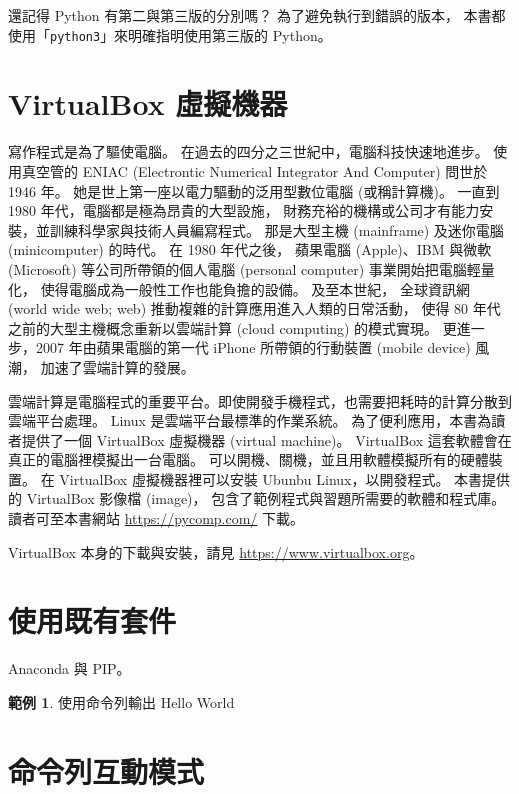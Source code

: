 \documentclass[a4paper,12pt]{book}
\theoremstyle{definition}
\newtheorem{example}{範例}[chapter]
\begin{document}
還記得 Python 有第二與第三版的分別嗎？
為了避免執行到錯誤的版本，
本書都使用「\verb+python3+」來明確指明使用第三版的 Python。

\section{VirtualBox 虛擬機器}
%
\label{c:runtime:vbox}

寫作程式是為了驅使電腦。
在過去的四分之三世紀中，電腦科技快速地進步。
使用真空管的 ENIAC (Electrontic Numerical Integrator And Computer)
問世於 1946 年。
她是世上第一座以電力驅動的泛用型數位電腦 (或稱計算機)。
一直到 1980 年代，電腦都是極為昂貴的大型設施，
財務充裕的機構或公司才有能力安裝，並訓練科學家與技術人員編寫程式。
那是大型主機 (mainframe) 及迷你電腦 (minicomputer) 的時代。
在 1980 年代之後，
蘋果電腦 (Apple)、IBM 與微軟 (Microsoft) 等公司所帶領的個人電腦 (personal computer) 事業開始把電腦輕量化，
使得電腦成為一般性工作也能負擔的設備。
及至本世紀，
全球資訊網 (world wide web; web) 推動複雜的計算應用進入人類的日常活動，
使得 80 年代之前的大型主機概念重新以雲端計算 (cloud computing) 的模式實現。
更進一步，2007 年由蘋果電腦的第一代 iPhone 所帶領的行動裝置 (mobile device) 風潮，
加速了雲端計算的發展。


雲端計算是電腦程式的重要平台。即使開發手機程式，也需要把耗時的計算分散到雲端平台處理。
Linux 是雲端平台最標準的作業系統。
為了便利應用，本書為讀者提供了一個 VirtualBox 虛擬機器 (virtual machine)。
VirtualBox 這套軟體會在真正的電腦裡模擬出一台電腦。
可以開機、關機，並且用軟體模擬所有的硬體裝置。
在 VirtualBox 虛擬機器裡可以安裝 Ubunbu Linux，以開發程式。
本書提供的 VirtualBox 影像檔 (image)，
包含了範例程式與習題所需要的軟體和程式庫。
讀者可至本書網站 \url{https://pycomp.com/} 下載。

VirtualBox 本身的下載與安裝，請見 \url{https://www.virtualbox.org}。

\section{使用既有套件}

Anaconda 與 PIP。

\begin{example}
使用命令列輸出 Hello World
\end{example}

\section{命令列互動模式}
\end{document}
